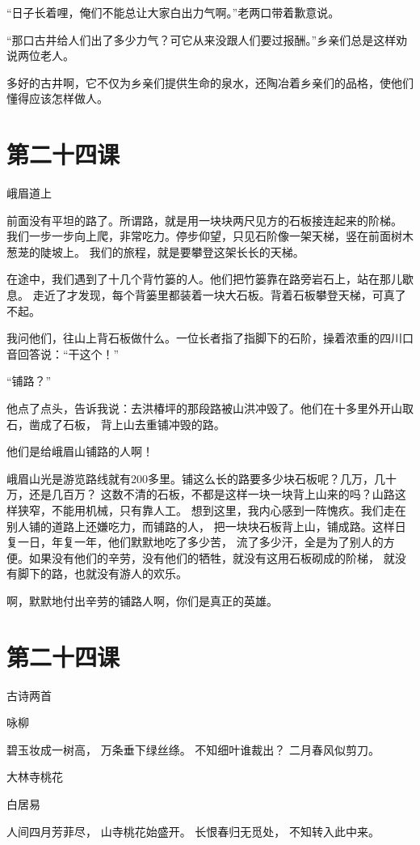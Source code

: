 \documentclass[12pt,UTF8]{ctexbook}
\begin{document}
“日子长着哩，俺们不能总让大家白出力气啊。”老两口带着歉意说。

“那口古井给人们出了多少力气？可它从来没跟人们要过报酬。”乡亲们总是这样劝说两位老人。

多好的古井啊，它不仅为乡亲们提供生命的泉水，还陶冶着乡亲们的品格，使他们懂得应该怎样做人。

\section{第二十四课}

峨眉道上

前面没有平坦的路了。所谓路，就是用一块块两尺见方的石板接连起来的阶梯。
我们一步一步向上爬，非常吃力。停步仰望，只见石阶像一架天梯，竖在前面树木葱茏的陡坡上。
我们的旅程，就是要攀登这架长长的天梯。

在途中，我们遇到了十几个背竹篓的人。他们把竹篓靠在路旁岩石上，站在那儿歇息。
走近了才发现，每个背篓里都装着一块大石板。背着石板攀登天梯，可真了不起。

我问他们，往山上背石板做什么。一位长者指了指脚下的石阶，操着浓重的四川口音回答说：“干这个！”

“铺路？”

他点了点头，告诉我说：去洪椿坪的那段路被山洪冲毁了。他们在十多里外开山取石，凿成了石板，
背上山去重铺冲毁的路。

他们是给峨眉山铺路的人啊！

峨眉山光是游览路线就有200多里。铺这么长的路要多少块石板呢？几万，几十万，还是几百万？
这数不清的石板，不都是这样一块一块背上山来的吗？山路这样狭窄，不能用机械，只有靠人工。
想到这里，我内心感到一阵愧疚。我们走在别人铺的道路上还嫌吃力，而铺路的人，
把一块块石板背上山，铺成路。这样日复一日，年复一年，他们默默地吃了多少苦，
流了多少汗，全是为了别人的方便。如果没有他们的辛劳，没有他们的牺牲，就没有这用石板砌成的阶梯，
就没有脚下的路，也就没有游人的欢乐。

啊，默默地付出辛劳的铺路人啊，你们是真正的英雄。

\section{第二十四课}

古诗两首

咏柳

碧玉妆成一树高，
万条垂下绿丝绦。
不知细叶谁裁出？
二月春风似剪刀。

大林寺桃花

白居易

人间四月芳菲尽，
山寺桃花始盛开。
长恨春归无觅处，
不知转入此中来。
\end{document}
